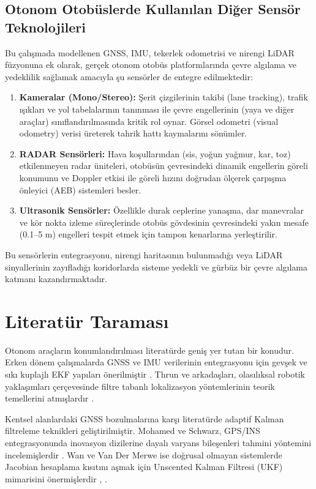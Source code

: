 ﻿\documentclass[conference]{IEEEtran}
\begin{document}
\subsection{Otonom Otobüslerde Kullanılan Diğer Sensör Teknolojileri}
Bu çalışmada modellenen GNSS, IMU, tekerlek odometrisi ve nirengi LiDAR füzyonuna ek olarak, gerçek otonom otobüs platformlarında çevre algılama ve yedeklilik sağlamak amacıyla şu sensörler de entegre edilmektedir:
\begin{enumerate}
    \item \textbf{Kameralar (Mono/Stereo):} Şerit çizgilerinin takibi (lane tracking), trafik ışıkları ve yol tabelalarının tanınması ile çevre engellerinin (yaya ve diğer araçlar) sınıflandırılmasında kritik rol oynar. Görsel odometri (visual odometry) verisi üreterek tahrik hattı kaymalarını sönümler.
    \item \textbf{RADAR Sensörleri:} Hava koşullarından (sis, yoğun yağmur, kar, toz) etkilenmeyen radar üniteleri, otobüsün çevresindeki dinamik engellerin göreli konumunu ve Doppler etkisi ile göreli hızını doğrudan ölçerek çarpışma önleyici (AEB) sistemleri besler.
    \item \textbf{Ultrasonik Sensörler:} Özellikle durak ceplerine yanaşma, dar manevralar ve kör nokta izleme süreçlerinde otobüs gövdesinin çevresindeki yakın mesafe (0.1--5 m) engelleri tespit etmek için tampon kenarlarına yerleştirilir.
\end{enumerate}
Bu sensörlerin entegrasyonu, nirengi haritasının bulunmadığı veya LiDAR sinyallerinin zayıfladığı koridorlarda sisteme yedekli ve gürbüz bir çevre algılama katmanı kazandırmaktadır.

\section{Literatür Taraması}
Otonom araçların konumlandırılması literatürde geniş yer tutan bir konudur. Erken dönem çalışmalarda GNSS ve IMU verilerinin entegrasyonu için gevşek ve sıkı kuplajlı EKF yapıları önerilmiştir \cite{groves2013principles}. Thrun ve arkadaşları, olasılıksal robotik yaklaşımları çerçevesinde filtre tabanlı lokalizasyon yöntemlerinin teorik temellerini atmışlardır \cite{thrun2005probabilistic}.

Kentsel alanlardaki GNSS bozulmalarına karşı literatürde adaptif Kalman filtreleme teknikleri geliştirilmiştir. Mohamed ve Schwarz, GPS/INS entegrasyonunda inovasyon dizilerine dayalı varyans bileşenleri tahmini yöntemini incelemişlerdir \cite{mohamed1999adaptive}. Wan ve Van Der Merwe ise doğrusal olmayan sistemlerde Jacobian hesaplama kısıtını aşmak için Unscented Kalman Filtresi (UKF) mimarisini önermişlerdir \cite{wan2000unscented}, \cite{sarkka2007unscented}.
\end{document}
